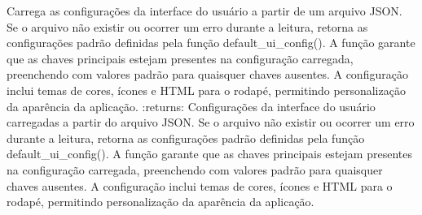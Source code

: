 \documentclass[letterpaper,10pt,english]{sphinxmanual}
\begin{document}

\begin{fulllineitems}
\label{\detokenize{api/config:config.load_ui_config}}
\pysigstartsignatures
\pysiglinewithargsret
{}
{}
{}
\pysigstopsignatures
\sphinxAtStartPar
Carrega as configurações da interface do usuário a partir de um arquivo JSON. Se o arquivo não existir ou ocorrer um erro durante a leitura, retorna as configurações padrão definidas pela função default\_ui\_config(). A função garante que as chaves principais estejam presentes na configuração carregada, preenchendo com valores padrão para quaisquer chaves ausentes. A configuração inclui temas de cores, ícones e HTML para o rodapé, permitindo personalização da aparência da aplicação.
:returns: Configurações da interface do usuário carregadas a partir do arquivo JSON. Se o arquivo não existir ou ocorrer um erro durante a leitura, retorna as configurações padrão definidas pela função default\_ui\_config(). A função garante que as chaves principais estejam presentes na configuração carregada, preenchendo com valores padrão para quaisquer chaves ausentes. A configuração inclui temas de cores, ícones e HTML para o rodapé, permitindo personalização da aparência da aplicação.
\begin{quote}\begin{description}
\sphinxAtStartPar
{}

\end{description}\end{quote}

\end{fulllineitems}

\end{document}
